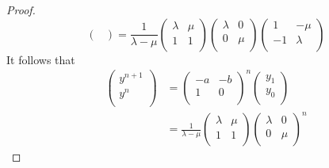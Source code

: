 \documentclass[../psets.tex]{subfiles}
\begin{document}
\begin{enumerate}
\begin{enumerate}
\begin{proof}
\begin{equation*}
\begin{pmatrix}
                \end{pmatrix}
                = \frac{1}{\lambda-\mu}
                \begin{pmatrix}
                    \lambda & \mu\\
                    1 & 1\\
                \end{pmatrix}
                \begin{pmatrix}
                    \lambda & 0\\
                    0 & \mu\\
                \end{pmatrix}
                \begin{pmatrix}
                    1 & -\mu\\
                    -1 & \lambda\\
                \end{pmatrix}
            \end{equation*}
            It follows that
            \begin{align*}
                \begin{pmatrix}
                    y^{n+1}\\
                    y^n\\
                \end{pmatrix}
                &=
                \begin{pmatrix}
                    -a & -b\\
                    1 & 0\\
                \end{pmatrix}^n
                \begin{pmatrix}
                    y_1\\
                    y_0\\
                \end{pmatrix}\\
                &= \frac{1}{\lambda-\mu}
                \begin{pmatrix}
                    \lambda & \mu\\
                    1 & 1\\
                \end{pmatrix}
                \begin{pmatrix}
                    \lambda & 0\\
                    0 & \mu\\
                \end{pmatrix}^n

\end{align*}
\end{proof}
\end{enumerate}
\end{enumerate}
\end{document}
